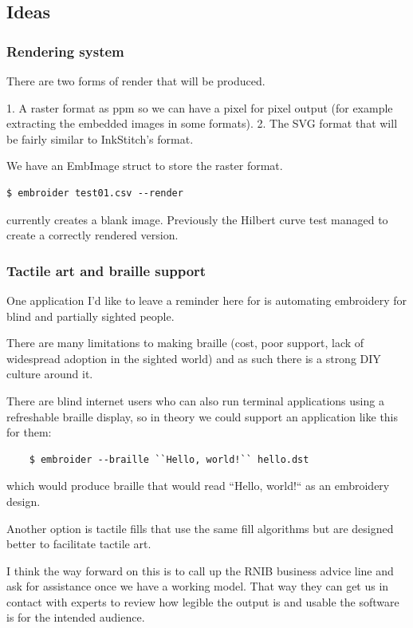 \documentclass[a4paper, 11pt]{report}
\begin{document}
\subsection{Ideas}

\subsubsection{Rendering system}

There are two forms of render that will be produced.

1. A raster format as ppm so we can have a pixel for pixel output (for example extracting the embedded images in some formats).
2. The SVG format that will be fairly similar to InkStitch's format.

We have an EmbImage struct to store the raster format.

\begin{verbatim}
$ embroider test01.csv --render
\end{verbatim}

currently creates a blank image. Previously the Hilbert curve test managed to
create a correctly rendered version.


\subsubsection{Tactile art and braille support}

One application I'd like to leave a reminder here for is automating embroidery
for blind and partially sighted people.

There are many limitations to making braille (cost, poor support, lack of
widespread adoption in the sighted world) and as such there is a strong DIY
culture around it.

There are blind internet users who can also run terminal applications using a
refreshable braille display, so in theory we could support an application like
this for them:

\begin{verbatim}
    $ embroider --braille ``Hello, world!`` hello.dst
\end{verbatim}

which would produce braille that would read ``Hello, world!`` as an embroidery design.

Another option is tactile fills that use the same fill algorithms but are
designed better to facilitate tactile art.

I think the way forward on this is to call up the RNIB business advice line and ask for assistance once we have a working model. That way they can get us in contact with experts to review how legible the output is and usable the software is for the intended audience.
\end{document}
